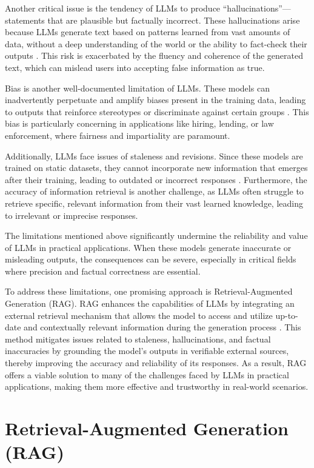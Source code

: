 Another critical issue is the tendency of LLMs to produce “hallucinations”—statements that are plausible but factually incorrect. These hallucinations arise because LLMs generate text based on patterns learned from vast amounts of data, without a deep understanding of the world or the ability to fact-check their outputs \cite{maynez2020faithfulness}. This risk is exacerbated by the fluency and coherence of the generated text, which can mislead users into accepting false information as true.

Bias is another well-documented limitation of LLMs. These models can inadvertently perpetuate and amplify biases present in the training data, leading to outputs that reinforce stereotypes or discriminate against certain groups \cite{bender2021dangers}. This bias is particularly concerning in applications like hiring, lending, or law enforcement, where fairness and impartiality are paramount.

Additionally, LLMs face issues of staleness and revisions. Since these models are trained on static datasets, they cannot incorporate new information that emerges after their training, leading to outdated or incorrect responses \cite{dhingra2022time}. Furthermore, the accuracy of information retrieval is another challenge, as LLMs often struggle to retrieve specific, relevant information from their vast learned knowledge, leading to irrelevant or imprecise responses.

The limitations mentioned above significantly undermine the reliability and value of LLMs in practical applications. When these models generate inaccurate or misleading outputs, the consequences can be severe, especially in critical fields where precision and factual correctness are essential.

To address these limitations, one promising approach is Retrieval-Augmented Generation (RAG). RAG enhances the capabilities of LLMs by integrating an external retrieval mechanism that allows the model to access and utilize up-to-date and contextually relevant information during the generation process \cite{lewis2020retrieval}. This method mitigates issues related to staleness, hallucinations, and factual inaccuracies by grounding the model’s outputs in verifiable external sources, thereby improving the accuracy and reliability of its responses. As a result, RAG offers a viable solution to many of the challenges faced by LLMs in practical applications, making them more effective and trustworthy in real-world scenarios.

\section{Retrieval-Augmented Generation (RAG)}

